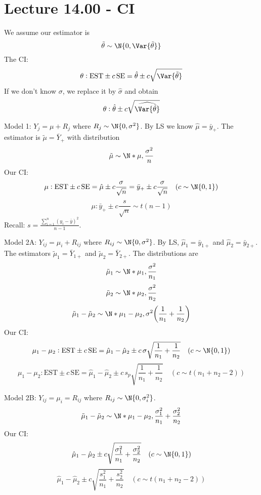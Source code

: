 \section{Lecture 14.00 - CI}
We assume our estimator is
\[ \tilde{\theta}\sim \N{0,\Var{\tilde{\theta}}} \]
The CI\@:
\[ \theta:\text{EST}\pm c\,\text{SE}=\hat{\theta}\pm c\sqrt{\Var{\tilde{\theta}}} \]
If we don't know $ \sigma $, we replace it by $ \hat{\sigma} $
and obtain
\[ \theta:\hat{\theta}\pm c\sqrt{\widehat{\Var{\tilde{\theta}}}} \]
\begin{Example}{}{}
    Model 1: $ Y_{j}=\mu+R_j $ where $ R_j \sim \N{0,\sigma^2} $.
    By LS we know $ \hat{\mu}=\bar{y}_+ $. The estimator is $ \tilde{\mu}=\bar{Y}_+ $
    with distribution
    \[ \tilde{\mu} \sim \N*{\mu,\frac{\sigma^2}{n}} \]
    Our CI\@:
    \[ \mu:\text{EST}\pm c\,\text{SE}=\hat{\mu}\pm c\frac{\sigma}{\sqrt{n}}
        =\bar{y}_+\pm c \frac{\sigma}{\sqrt{n}}\quad (c \sim \N{0,1})  \]
    \[ \mu:\bar{y}_+ \pm c \frac{s}{\sqrt{n}}\sim t(n-1)  \]
    Recall: $ \displaystyle s=\frac{\sum_{i=1}^{n} (y_i-\bar{y})^2}{n-1} $.
\end{Example}
\begin{Example}{}{}
    Model 2A\@: $ Y_{ij} =\mu_i+R_{ij} $ where $ R_{ij}\sim \N{0,\sigma^2} $.
    By LS, $ \hat{\mu}_1=\bar{y}_{1+} $ and $ \hat{\mu}_2=\bar{y}_{2+} $.
    The estimators $ \tilde{\mu}_1=\bar{Y}_{1+} $ and $ \tilde{\mu}_2=\bar{Y}_{2+} $.
    The distributions are
    \[ \tilde{\mu}_1 \sim \N*{\mu_1,\frac{\sigma^2}{n_1} } \]
    \[ \tilde{\mu}_2 \sim \N*{\mu_2,\frac{\sigma^2}{n_2} } \]
    \[ \tilde{\mu}_1-\tilde{\mu}_2
        \sim \N*{\mu_1-\mu_2,\sigma^2\biggl(\frac{1}{n_1}+\frac{1}{n_2}\biggr)} \]
    Our CI\@:
    \[ \mu_1-\mu_2:\text{EST}\pm c\,\text{SE}
        =\hat{\mu}_1-\hat{\mu}_2\pm c\,\sigma\sqrt{\frac{1}{n_1}+\frac{1}{n_2} }
        \quad(c \sim \N{0,1}) \]
    \[ \mu_1-\mu_2:\text{EST}\pm c\,\text{SE}
        =\hat{\mu}_1-\hat{\mu}_2\pm c\, s_p\sqrt{\frac{1}{n_1}+\frac{1}{n_2} }
        \quad(c \sim t(n_1+n_2-2)) \]
\end{Example}
\begin{Example}{}{}
    Model 2B\@: $ Y_{ij}=\mu_i=R_{ij} $ where $ R_{ij}\sim \N{0,\sigma_i^2} $.
    \[ \tilde{\mu}_1-\tilde{\mu}_2
        \sim \N*{\mu_1-\mu_2,\frac{\sigma_1^2}{n_1} +\frac{\sigma_2^2}{n_2} } \]
    Our CI\@:
    \[ \hat{\mu}_1-\hat{\mu}_2\pm c\sqrt{\frac{\sigma_1^2}{n_1} +\frac{\sigma_2^2}{n_2}}
        \quad(c \sim \N{0,1}) \]
    \[ \hat{\mu}_1-\hat{\mu}_2\pm c\sqrt{\frac{s_1^2}{n_1} +\frac{s_2^2}{n_2}}
        \quad(c \sim t(n_1+n_2-2)) \]
\end{Example}
